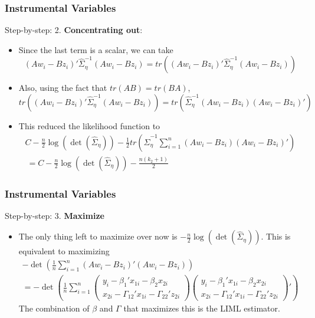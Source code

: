 \documentclass{beamer}
\begin{document}
\begin{frame}
\frametitle{Instrumental Variables}
Step-by-step: 2. \textbf{Concentrating out}:
\begin{itemize}
\item Since the last term is a scalar, we can take
\[
(Aw_i-Bz_i)'\widehat{\Sigma}_\eta^{-1}(Aw_i-Bz_i)=tr\left((Aw_i-Bz_i)'\widehat{\Sigma}_\eta^{-1}(Aw_i-Bz_i)\right)
\]
\item Also, using the fact that $tr(AB)=tr(BA)$, 
\[
tr\left((Aw_i-Bz_i)'\widehat{\Sigma}_\eta^{-1}(Aw_i-Bz_i)\right)=tr\left(\widehat{\Sigma}_\eta^{-1}(Aw_i-Bz_i)(Aw_i-Bz_i)'\right)
\]
\item This reduced the likelihood function to
\small{\begin{gather*}
C - \frac{n}{2}\log(\det(\widehat{\Sigma}_\eta)) - \frac{1}{2}tr\left(\widehat{\Sigma}_\eta^{-1}\sum_{i=1}^n(Aw_i-Bz_i)(Aw_i-Bz_i)'\right) \\\
= C-\frac{n}{2}\log(\det(\widehat{\Sigma}_\eta))-\frac{n(k_2+1)}{2}
\end{gather*}}\normalsize
\end{itemize}
\end{frame}

\begin{frame}
\frametitle{Instrumental Variables}
Step-by-step: 3.  \textbf{Maximize}
\begin{itemize}
\item The only thing left to maximize over now is $-\frac{n}{2}\log(\det(\widehat{\Sigma}_\eta))$. This is equivalent to maximizing
\footnotesize{\begin{gather*}
-\det\left(\frac{1}{n}\sum_{i=1}^n(Aw_i-Bz_i)'(Aw_i-Bz_i)\right)
\\ =
-\det\left(\frac{1}{n}\sum_{i=1}^n\begin{pmatrix} y_ i - \beta_1'x_{1i}-\beta_2x_{2i} \\ x_{2i}-\Gamma_{12}'x_{1i}-\Gamma_{22}'z_{2i} \end{pmatrix}\begin{pmatrix} y_ i - \beta_1'x_{1i}-\beta_2x_{2i} \\ x_{2i}-\Gamma_{12}'x_{1i}-\Gamma_{22}'z_{2i} \end{pmatrix}'\right)
\end{gather*}}\normalsize
The combination of $\beta$ and $\Gamma$ that maximizes this is the LIML estimator.
\end{itemize}
\end{frame}
\end{document}
